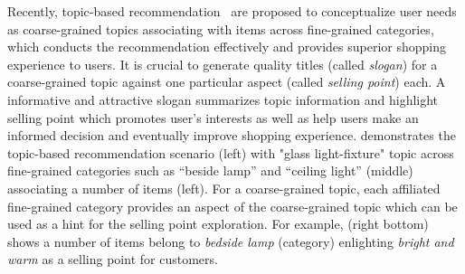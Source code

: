 Recently, topic-based recommendation~\cite{luo2019conceptualize} are proposed to conceptualize user needs as coarse-grained topics associating with items across fine-grained categories, which conducts the recommendation effectively and provides superior shopping experience to users. It is crucial to generate quality titles (called \emph{slogan}) for a coarse-grained topic against one particular aspect (called \emph{selling point}) each.
A informative and attractive slogan summarizes topic information and highlight selling point which promotes user's interests as well as help users make an informed decision and eventually improve shopping experience.
 demonstrates the topic-based recommendation scenario (left) with "glass light-fixture" topic across 
fine-grained categories such as ``beside lamp'' and ``ceiling light'' (middle) associating a number of items (left).
For a coarse-grained topic, each affiliated fine-grained category provides an aspect of the coarse-grained topic which can be used as a hint for the selling point exploration.
For example,  (right bottom) shows a number of items belong to \emph{bedside lamp} (category) enlighting \emph{bright and warm} as a selling point for customers.

